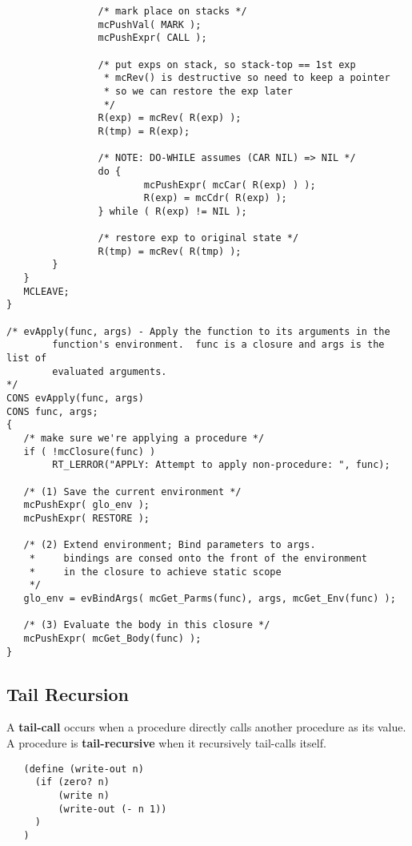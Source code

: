 \begin{verbatim}
                /* mark place on stacks */
                mcPushVal( MARK );
                mcPushExpr( CALL );

                /* put exps on stack, so stack-top == 1st exp
                 * mcRev() is destructive so need to keep a pointer
                 * so we can restore the exp later
                 */
                R(exp) = mcRev( R(exp) );
                R(tmp) = R(exp);

                /* NOTE: DO-WHILE assumes (CAR NIL) => NIL */
                do {
                        mcPushExpr( mcCar( R(exp) ) );
                        R(exp) = mcCdr( R(exp) );
                } while ( R(exp) != NIL );

                /* restore exp to original state */
                R(tmp) = mcRev( R(tmp) );
        }
   }
   MCLEAVE;
}

/* evApply(func, args) - Apply the function to its arguments in the
        function's environment.  func is a closure and args is the list of
        evaluated arguments.
*/
CONS evApply(func, args)
CONS func, args;
{
   /* make sure we're applying a procedure */
   if ( !mcClosure(func) )
        RT_LERROR("APPLY: Attempt to apply non-procedure: ", func);

   /* (1) Save the current environment */
   mcPushExpr( glo_env );
   mcPushExpr( RESTORE );

   /* (2) Extend environment; Bind parameters to args.
    *     bindings are consed onto the front of the environment
    *     in the closure to achieve static scope
    */
   glo_env = evBindArgs( mcGet_Parms(func), args, mcGet_Env(func) );

   /* (3) Evaluate the body in this closure */
   mcPushExpr( mcGet_Body(func) );
}
\end{verbatim}

   \subsection{Tail Recursion}

	A {\bf tail-call} occurs when a procedure directly calls another
procedure as its value.  A procedure is {\bf tail-recursive} when it
recursively tail-calls itself.

\begin{verbatim}
   (define (write-out n)
     (if (zero? n)
         (write n)
         (write-out (- n 1))
     )
   )
\end{verbatim}

